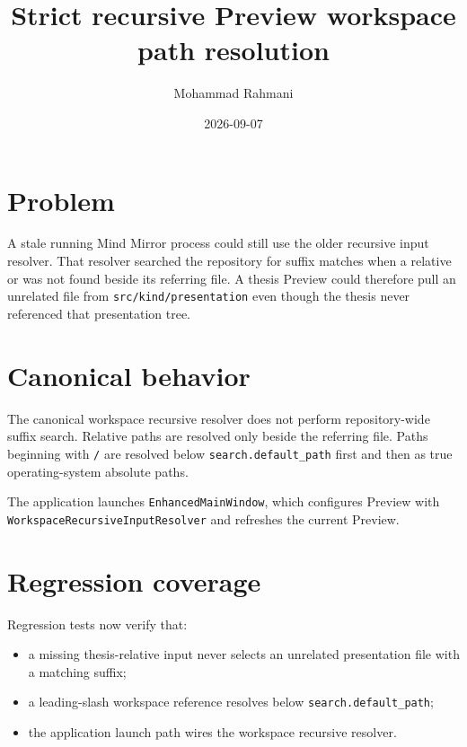\documentclass[a4paper]{article}
\title{Strict recursive Preview workspace path resolution}
\date{2026-09-07}
\author{Mohammad Rahmani}
\begin{document}
\maketitle

\section{Problem}
A stale running Mind Mirror process could still use the older recursive input
resolver. That resolver searched the repository for suffix matches when a
relative \verb|| or \verb|| was not found beside its referring
file. A thesis Preview could therefore pull an unrelated file from
\verb|src/kind/presentation| even though the thesis never referenced that
presentation tree.

\section{Canonical behavior}
The canonical workspace recursive resolver does not perform repository-wide
suffix search. Relative paths are resolved only beside the referring file.
Paths beginning with \verb|/| are resolved below
\verb|search.default_path| first and then as true operating-system absolute
paths.

The application launches \verb|EnhancedMainWindow|, which configures Preview
with \verb|WorkspaceRecursiveInputResolver| and refreshes the current Preview.

\section{Regression coverage}
Regression tests now verify that:
\begin{itemize}
   \item a missing thesis-relative input never selects an unrelated
   presentation file with a matching suffix;
   \item a leading-slash workspace reference resolves below
   \verb|search.default_path|;
   \item the application launch path wires the workspace recursive resolver.
\end{itemize}
\end{document}

